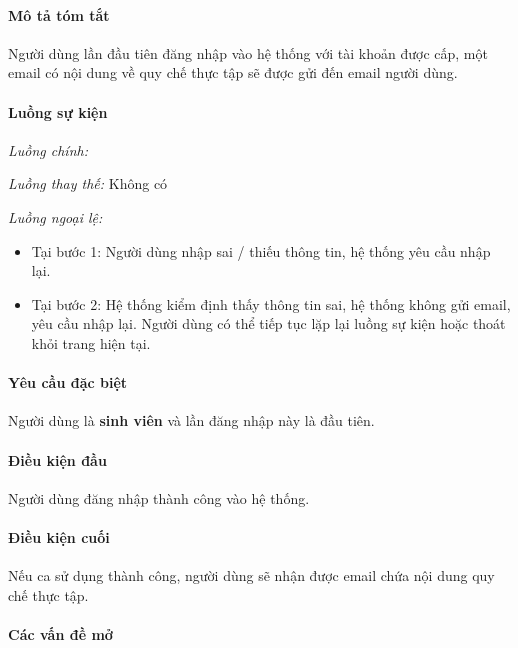\documentclass[./../main.tex]{subfiles}
\begin{document}
\paragraph*{Mô tả tóm tắt}

Người dùng lần đầu tiên đăng nhập vào hệ thống với tài khoản được cấp,
một email có nội dung về quy chế thực tập sẽ được gửi đến email người
dùng.

\paragraph*{Luồng sự kiện}

\emph{Luồng chính:}

\emph{Luồng thay thế:} Không có

\emph{Luồng ngoại lệ:}

\begin{itemize}
\item
  
  Tại bước 1: Người dùng nhập sai / thiếu thông tin, hệ thống yêu cầu
  nhập lại.
  
\item
  
  Tại bước 2: Hệ thống kiểm định thấy thông tin sai, hệ thống không gửi
  email, yêu cầu nhập lại. Người dùng có thể tiếp tục lặp lại luồng sự
  kiện hoặc thoát khỏi trang hiện tại.
  
\end{itemize}

\paragraph*{Yêu cầu đặc biệt}

Người dùng là \textbf{sinh viên} và lần đăng nhập này là đầu tiên.

\paragraph*{Điều kiện đầu}

Người dùng đăng nhập thành công vào hệ thống.

\paragraph*{Điều kiện cuối}

Nếu ca sử dụng thành công, người dùng sẽ nhận được email chứa nội dung
quy chế thực tập.

\paragraph*{Các vấn đề mở}
\end{document}
